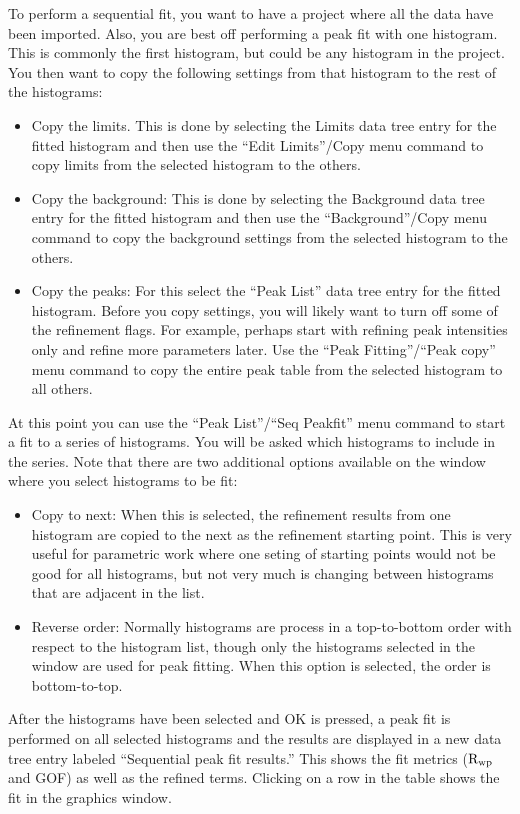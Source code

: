 To perform a sequential fit, you want to have a project where all the data have been imported. Also, you are best off performing a peak fit with one histogram. This is commonly the first histogram, but could be any histogram in the project. You then want to copy the following settings from that histogram to the rest of the histograms:
\begin{itemize}
    \item Copy the limits. This is done by selecting the Limits data tree entry for the fitted histogram and then use the ``Edit Limits''/Copy menu command to copy limits from the selected histogram to the others.
    \item Copy the background: This is done by selecting the Background data tree entry for the fitted histogram and then use the ``Background''/Copy menu command to copy the background settings from the selected histogram to the others.
    \item Copy the peaks: For this select the ``Peak List'' data tree entry for the fitted histogram. Before you copy settings, you will likely want to turn off some of the refinement flags. For example, perhaps start with refining peak intensities only and refine more parameters later. Use the ``Peak Fitting''/``Peak copy'' menu command to copy the entire peak table from the selected histogram to all others. 
\end{itemize}

At this point you can use the ``Peak List''/``Seq Peakfit'' menu command to start a fit to a series of histograms. You will be asked which histograms to include in the series. Note that there are two additional options available on the window where you select histograms to be fit:
\begin{itemize}
    \item Copy to next: When this is selected, the refinement results from one histogram are copied to the next as the refinement starting point. This is very useful for parametric work where one seting of starting points would not be good for all histograms, but not very much is changing between histograms that are adjacent in the list.
    \item Reverse order: Normally histograms are process in a top-to-bottom order with respect to the histogram list, though only the histograms selected in the window are used for peak fitting. When this option is selected, the order is bottom-to-top. 
\end{itemize}

After the histograms have been selected and OK is pressed, a peak fit is performed on all selected histograms and the results are displayed in a new data tree entry labeled ``Sequential peak fit results.'' This shows the fit metrics ($\rm R_{wp}$ and GOF) as well as the refined terms. Clicking on a row in the table shows the fit in the graphics window. 

